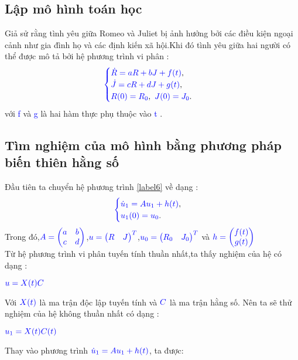 \documentclass[a4paper]{article}
\begin{document}
 \subsection{Lập mô hình toán học}
	Giả sử rằng tình yêu giữa Romeo và Juliet bị ảnh hưởng bởi các điều kiện ngoại cảnh như gia đình họ và các định kiến xã hội.Khi đó tình yêu giữa hai người có thể được mô tả bởi hệ phương trình vi phân : 
 \begin{align}
	    \textcolor{blue}{
	    \begin{cases}
            \dot R = aR + bJ + f(t) \textcolor{black}{,}\\
            \dot J = cR + dJ + g(t) \textcolor{black}{,}\\
            R(0) = R_{0}\textcolor{black}{,} \enskip J(0) = J_{0} \textcolor{black}{.}
        \end{cases}
        }
        \label{label6}
	\end{align}
với \textcolor{blue}{f} và \textcolor{blue}{g} là hai hàm thực phụ thuộc vào  \textcolor{blue}{t} .
\subsection{Tìm nghiệm của mô hình bằng phương pháp biến thiên hằng số}
Đầu tiên ta chuyển hệ phương trình \eqref{label6} về dạng :
\begin{align}
	    \textcolor{blue}{
	    \begin{cases}
            \dot u_1 = Au_1 + h(t)\textcolor{black}{,}\\
            u_1(0) = u\sb{0}\textcolor{black}{.}
        \end{cases}
        }
        \label{label7}
\end{align}
Trong đó,$\textcolor{blue}{A = \begin{pmatrix} a & b\\ c & d \end{pmatrix}}$,\enskip $\textcolor{blue}{u = \begin{pmatrix} R & J \end{pmatrix}\sp{T}}$\enskip ,\enskip $\textcolor{blue}{u\sb{0} = \begin{pmatrix} R\sb{0} & J\sb{0} \end{pmatrix}\sp{T}}$ và $\textcolor{blue}{h =\begin{pmatrix} f(t) \\ g(t) \end{pmatrix}}$\\
Từ hệ phương trình vi phân tuyến tính thuần nhất,ta thấy nghiệm của hệ có dạng : 
\begin{center}
$\textcolor{blue}{u=X(t)C}$
\end{center}
Với $\textcolor{blue}{X(t)}$ là ma trận độc lập tuyến tính và  $\textcolor{blue}{C}$ là ma trận hằng số. Nên ta sẽ thử nghiệm của hệ không thuần nhất có dạng : 
\begin{center}
$\textcolor{blue}{u_1=X(t)C(t)}$
\end{center} 
Thay vào phương trình $\textcolor{blue}{\dot u_1 = Au_1 + h(t) }$, ta được:
\end{document}
